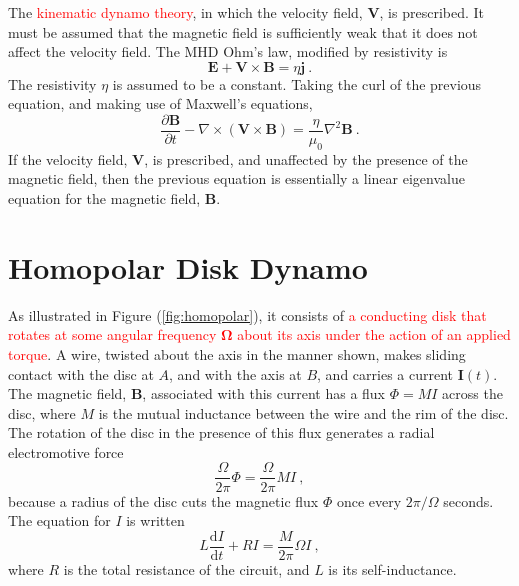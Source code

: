 \documentclass[12pt,a4paper]{article}
\renewcommand{\vec}[1]{\boldsymbol{#1}}
\newcommand{\dif}{\mathrm{d}}
\newcounter{theo}[section]\setcounter{theo}{0}
\begin{document}
The \textcolor{red}{kinematic dynamo theory}, in which the velocity field, $\vec{V}$, is prescribed. It must be assumed that the magnetic field is sufficiently weak that it does not affect the velocity field. The MHD Ohm's law, modified by resistivity is
\begin{equation}
\vec{E} +\vec{V}\times \vec{B} = \eta \vec{j} ~.
\end{equation}
The resistivity $\eta$ is assumed to be a constant. Taking the curl of the previous equation, and making use of Maxwell's equations, 
\begin{equation}
\dfrac{\partial \vec{B}}{\partial t} -\nabla \times (\vec{V}\times \vec{B} ) = \dfrac{\eta}{\mu_0} \nabla^2 \vec{B} ~.
\end{equation}
If the velocity field, $\vec{V}$, is prescribed, and unaffected by the presence of the magnetic field, then the previous equation is essentially a linear eigenvalue equation for the magnetic field, $\vec{B}$.

\section{Homopolar Disk Dynamo}
\cite{Plasma2014} As illustrated in Figure (\ref{fig:homopolar}), it consists of \textcolor{red}{a conducting disk that rotates at some angular frequency $\vec{\Omega}$ about its axis under the action of an applied torque}. A wire, twisted about the axis in the manner shown, makes sliding contact with the disc at $A$, and with the axis at $B$, and carries a current $\vec{I}(t)$. The magnetic field, $\vec{B}$, associated with this current has a flux $\Phi = M I$ across the disc, where $M$ is the mutual inductance between the wire and the rim of the disc. The rotation of the disc in the presence of this flux generates a radial electromotive force
\begin{equation}
\dfrac{\Omega}{2\pi} \Phi = \dfrac{\Omega}{2\pi} MI ~,
\end{equation}
because a radius of the disc cuts the magnetic flux $\Phi$ once every $2\pi/\Omega$ seconds. The equation for $I$ is written
\begin{equation}
L\dfrac{\dif I}{\dif t} +RI = \dfrac{M}{2\pi} \Omega I ~,
\end{equation}
where $R$ is the total resistance of the circuit, and $L$ is its self-inductance. 
\end{document}
